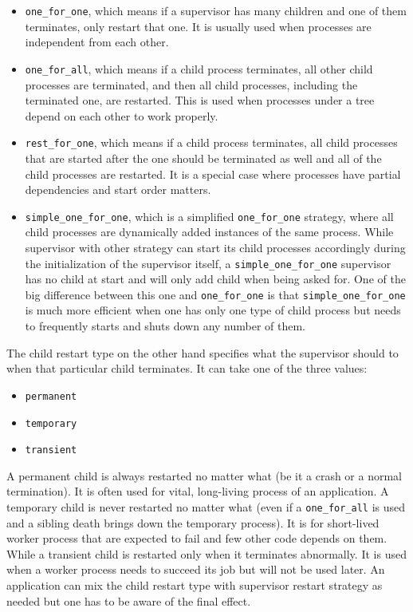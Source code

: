 \begin{itemize}

\item \verb|one_for_one|, which means if a supervisor has many children and one of them terminates, only restart that one. It is usually used when processes are independent from each other.

\item \verb|one_for_all|, which means if a child process terminates, all other child processes are terminated, and then all child processes, including the terminated one, are restarted. This is used when processes under a tree depend on each other to work properly.

\item \verb|rest_for_one|, which means if a child process terminates, all child processes that are started after the one should be terminated as well and all of the child processes are restarted. It is a special case where processes have partial dependencies and start order matters.

\item \verb|simple_one_for_one|, which is a simplified \verb|one_for_one| strategy, where all child processes are dynamically added instances of the same process. While supervisor with other strategy can start its child processes accordingly during the initialization of the supervisor itself, a \verb|simple_one_for_one| supervisor has no child at start and will only add child when being asked for. One of the big difference between this one and \verb|one_for_one| is that \verb|simple_one_for_one| is much more efficient when one has only one type of child process but needs to frequently starts and shuts down any number of them.

\end{itemize}

The child restart type on the other hand specifies what the supervisor should to when that particular child terminates. It can take one of the three values:

\begin{itemize}

\item \verb|permanent|
\item \verb|temporary|
\item \verb|transient|

\end{itemize}

A permanent child is always restarted no matter what (be it a crash or a normal termination). It is often used for vital, long-living process of an application. A temporary child is never restarted no matter what (even if a \verb|one_for_all| is used and a sibling death brings down the temporary process). It is for short-lived worker process that are expected to fail and few other code depends on them. While a transient child is restarted only when it terminates abnormally. It is used when a worker process needs to succeed its job but will not be used later. An application can mix the child restart type with supervisor restart strategy as needed but one has to be aware of the final effect. 


